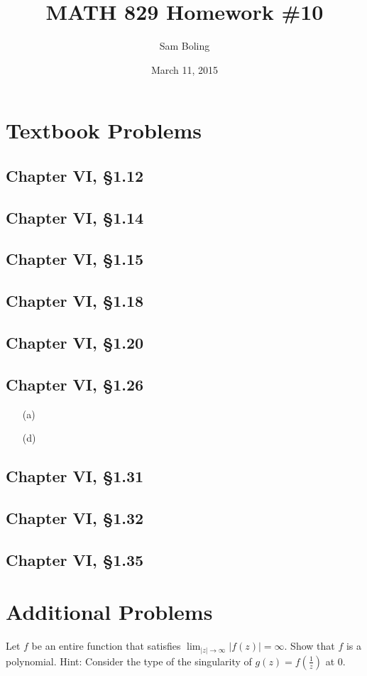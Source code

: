 \documentclass{article}
\title{MATH 829 Homework \#10}
\date{March 11, 2015}
\author{Sam Boling}
\newcounter{Problem}
\newenvironment{Problem}{\begin{Exercise}[name={Problem},
                                          counter={Problem}]}
                        {\end{Exercise}}
\begin{document}
\begin{titlepage}
\maketitle
\end{titlepage}

\section{Textbook Problems}
\subsection*{Chapter VI, \S1.12}

\subsection*{Chapter VI, \S1.14}

\subsection*{Chapter VI, \S1.15}

\subsection*{Chapter VI, \S1.18}

\subsection*{Chapter VI, \S1.20}

\subsection*{Chapter VI, \S1.26}
\begin{enumerate}
  \item[(a)]{
  }
  \item[(d)]{
  }
\end{enumerate}

\subsection*{Chapter VI, \S1.31}

\subsection*{Chapter VI, \S1.32}

\subsection*{Chapter VI, \S1.35}


\section{Additional Problems}
\begin{Problem}
Let $f$ be an entire function that satisfies
$\lim_{|z| \to \infty} |f(z)| = \infty$. Show that $f$ is a polynomial.
Hint: Consider the type of the singularity of $g(z) = f(\frac{1}{z})$
at 0.
\end{Problem}
\end{document}
